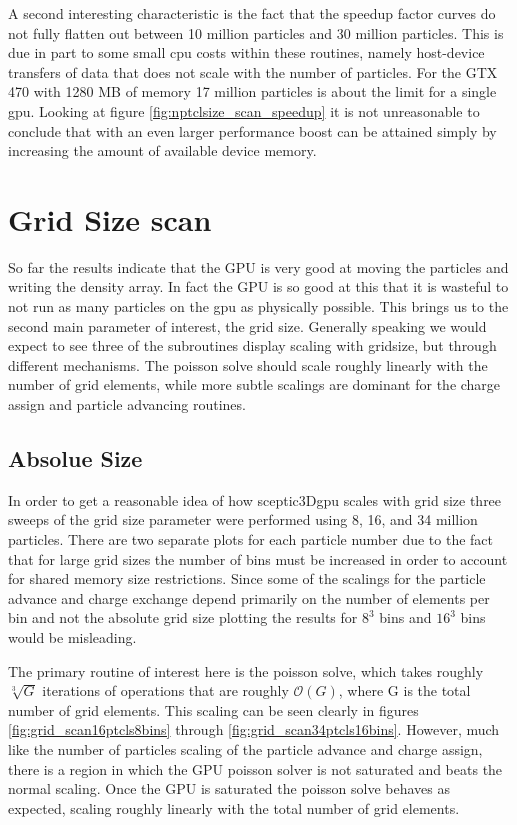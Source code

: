 A second interesting characteristic is the fact that the speedup factor curves do not fully flatten out between 10 million particles and 30 million particles. This is due in part to some small cpu costs within these routines, namely host-device transfers of data that does not scale with the number of particles. For the GTX 470 with 1280 MB of memory 17 million particles is about the limit for a single gpu. Looking at figure \ref{fig:nptclsize_scan_speedup} it is not unreasonable to conclude that with an even larger performance boost can be attained simply by increasing the amount of available device memory.

	
\section{Grid Size scan}
So far the results indicate that the GPU is very good at moving the particles and writing the density array. In fact the GPU is so good at this that it is wasteful to not run as many particles on the gpu as physically possible. This brings us to the second main parameter of interest, the grid size. Generally speaking we would expect to see three of the subroutines display scaling with gridsize, but through different mechanisms. The poisson solve should scale roughly linearly with the number of grid elements, while more subtle scalings are dominant for the charge assign and particle advancing routines. 

	\subsection{Absolue Size}
	In order to get a reasonable idea of how sceptic3Dgpu scales with grid size three sweeps of the grid size parameter were performed using 8, 16, and 34 million particles. There are two separate plots for each particle number due to the fact that for large grid sizes the number of bins must be increased in order to account for shared memory size restrictions. Since some of the scalings for the particle advance and charge exchange depend primarily on the number of elements per bin and not the absolute grid size plotting the results for $8^3$ bins and $16^3$ bins would be misleading.

The primary routine of interest here is the poisson solve, which takes roughly $\sqrt[3]{G}$ iterations of operations that are roughly $\mathcal{O}(G)$, where G is the total number of grid elements. This scaling can be seen clearly in figures \ref{fig:grid_scan16ptcls8bins} through \ref{fig:grid_scan34ptcls16bins}. However, much like the number of particles scaling of the particle advance and charge assign, there is a region in which the GPU poisson solver is not saturated and beats the normal scaling. Once the GPU is saturated the poisson solve behaves as expected, scaling roughly linearly with the total number of grid elements. 


